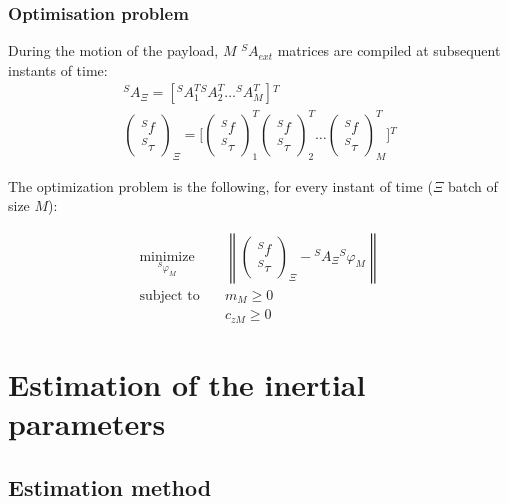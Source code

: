 \documentclass[usenames,dvipsnames]{beamer}
\newcommand{\norm}[1]{\left\lVert#1\right\rVert}
\begin{document}
\begin{frame}
 \frametitle{Optimisation problem}

 During the motion of the payload, $M$ ${}^S A_{ext}$ matrices are compiled at subsequent instants of time:
 \begin{gather}
  {}^S A_{\Xi} = [{}^S A_1^T {}^S A_2^T \ldots {}^S A_M^T] {}^T \\
  \begin{pmatrix}
   {}^S f    \\
   {}^S \tau
  \end{pmatrix}_{\Xi}
  = \Bigg[\begin{pmatrix}
  {}^S f    \\
  {}^S \tau
  \end{pmatrix}_1^T
  \begin{pmatrix}
   {}^S f    \\
   {}^S \tau
  \end{pmatrix}_2^T
  \ldots \begin{pmatrix}
  {}^S f    \\
  {}^S \tau
  \end{pmatrix}_M^T \Bigg] {}^T
 \end{gather}

 The optimization problem is the following, for every instant of time ($\Xi$ batch of size $M$):

 \begin{align*}
  \underset{{}^S \varphi_M}{\textrm{minimize}} \quad &
  \norm{ \begin{pmatrix}
  {}^S f    \\
  {}^S \tau
  \end{pmatrix}_{\Xi}
  - {}^S A_{\Xi} {}^S \varphi_M } \\
  \textrm{subject \ to} \quad & m_M \geq 0   \\
                              & c_{zM} \geq 0
 \end{align*}

\end{frame}

\section{Estimation of the inertial parameters}
\subsection{Estimation method}
\end{document}

